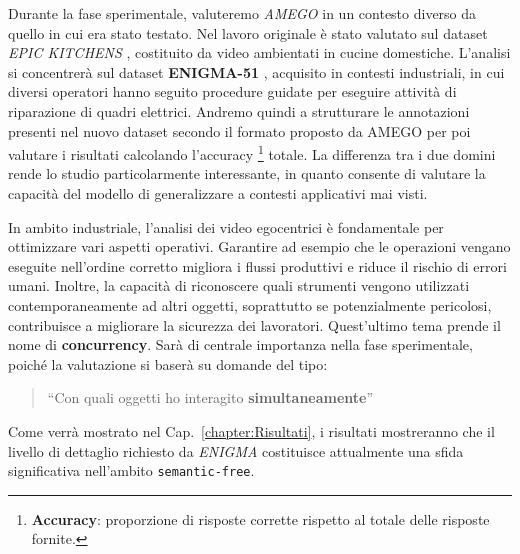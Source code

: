 Durante la fase sperimentale, valuteremo \emph{AMEGO} in un contesto diverso da quello in cui era stato testato. Nel lavoro originale è stato valutato sul dataset \emph{EPIC KITCHENS} \cite{Damen2021PAMI}, costituito da video ambientati in cucine domestiche. L'analisi si concentrerà sul dataset \textbf{ENIGMA-51} \cite{ragusa2023enigma51}, acquisito in contesti industriali, in cui diversi operatori hanno seguito procedure guidate per eseguire attività di riparazione di quadri elettrici. Andremo quindi a strutturare le annotazioni presenti nel nuovo dataset secondo il formato proposto da AMEGO per poi valutare i risultati calcolando l'accuracy \footnote{\textbf{Accuracy}: proporzione di risposte corrette rispetto al totale delle risposte fornite.} totale. La differenza tra i due domini rende lo studio particolarmente interessante, in quanto consente di valutare la capacità del modello di generalizzare a contesti applicativi mai visti.

In ambito industriale, l'analisi dei video egocentrici è fondamentale per ottimizzare vari aspetti operativi. Garantire ad esempio che le operazioni vengano eseguite nell'ordine corretto migliora i flussi produttivi e riduce il rischio di errori umani. Inoltre, la capacità di riconoscere quali strumenti vengono utilizzati contemporaneamente ad altri oggetti, soprattutto se potenzialmente pericolosi, contribuisce a migliorare la sicurezza dei lavoratori. Quest'ultimo tema prende il nome di \textbf{concurrency}. Sarà di centrale importanza nella fase sperimentale, poiché la valutazione si baserà su domande del tipo:
\begin{quote}
    ``Con quali oggetti ho interagito \textbf{simultaneamente}''
\end{quote}
Come verrà mostrato nel Cap.~\ref{chapter:Risultati}, i risultati mostreranno che il livello di dettaglio richiesto da \emph{ENIGMA} costituisce attualmente una sfida significativa nell'ambito \texttt{semantic-free}.
